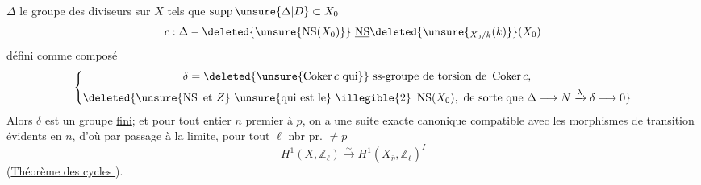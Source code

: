 $\Delta$ le groupe des diviseurs sur $X$ tels que $\operatorname{supp}\unsure{\Delta|D}\subset X_0$
\[
c:\Delta\mathbin{-}\deleted{\unsure{\operatorname{NS}(X_0)}}\ \underline{\operatorname{NS}}\deleted{\unsure{{}_{X_0/k}(k)}}(X_0)
\]
défini comme composé
\[
\left\{\begin{gathered}
\delta=\deleted{\unsure{\operatorname{Coker}c\text{ qui}}}\ \text{ss-groupe de torsion de }\operatorname{Coker}c,\\
\deleted{\unsure{\operatorname{NS}\text{ et }Z}\ \text{\unsure{qui est le}}\ \text{\illegible{2}}\ \operatorname{NS}(X_0),\ \text{de sorte que }\Delta\longrightarrow N\xrightarrow{\lambda}\delta\longrightarrow0}
\end{gathered}\right.
\]
 Alors $\delta$ est un groupe \uline{fini};  et pour tout entier $n$ premier à $p$, on a une suite exacte canonique
compatible avec les morphismes de transition évidents en $n$, d'où par passage à la limite, pour tout $\ell$ nbr pr. $\neq p$
\[
H^1(X,\mathbb Z_\ell)\xrightarrow{\sim}H^1(X_{\bar\eta},\mathbb Z_\ell)^I
\]
(\uline{Théorème des cycles }).

